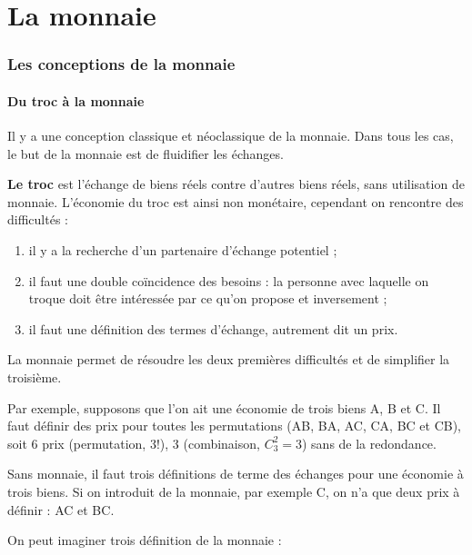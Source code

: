 \part{La monnaie}

\section{Les conceptions de la monnaie}

	\subsection{Du troc à la monnaie}
	
	Il y a une conception classique et néoclassique de la monnaie. Dans tous les cas, le but de la monnaie est de fluidifier les échanges.
	
	\textbf{Le troc} est l'échange de biens réels contre d'autres biens réels, sans utilisation de monnaie. L'économie du troc est ainsi non monétaire, cependant on rencontre des difficultés :
	
	\begin{enumerate}
		\item il y a la recherche d'un partenaire d'échange potentiel ;
		\item il faut une double coïncidence des besoins : la personne avec laquelle on troque doit être intéressée par ce qu'on propose et inversement ;
		\item il faut une définition des termes d'échange, autrement dit un prix.
	\end{enumerate}
	
	La monnaie permet de résoudre les deux premières difficultés et de simplifier la troisième.
	
	Par exemple, supposons que l'on ait une économie de trois biens A, B et C. Il faut définir des prix pour toutes les permutations (AB, BA, AC, CA, BC et CB), soit 6 prix (permutation, $3!$), 3 (combinaison, $C_3^2 = 3$) sans de la redondance.
	
	Sans monnaie, il faut trois définitions de terme des échanges pour une économie à trois biens. Si on introduit de la monnaie, par exemple C, on n'a que deux prix à définir : AC et BC.
	
	On peut imaginer trois définition de la monnaie :
	
